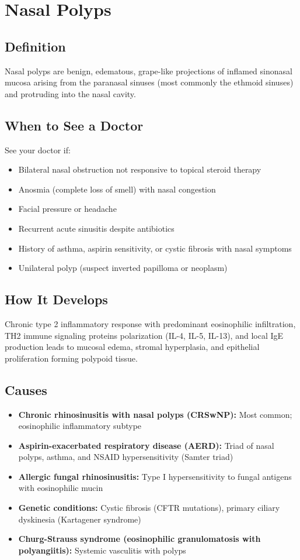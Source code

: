 \chapter{Nasal Polyps}

\section*{Definition}
Nasal polyps are benign, edematous, grape-like projections of inflamed sinonasal mucosa arising from the paranasal sinuses (most commonly the ethmoid sinuses) and protruding into the nasal cavity.

\section*{When to See a Doctor}
See your doctor if:
\begin{itemize}
  \item Bilateral nasal obstruction not responsive to topical steroid therapy
  \item Anosmia (complete loss of smell) with nasal congestion
  \item Facial pressure or headache
  \item Recurrent acute sinusitis despite antibiotics
  \item History of asthma, aspirin sensitivity, or cystic fibrosis with nasal symptoms
  \item Unilateral polyp (suspect inverted papilloma or neoplasm)
\end{itemize}

\section*{How It Develops}
Chronic type 2 inflammatory response with predominant eosinophilic infiltration, TH2 immune signaling proteins polarization (IL-4, IL-5, IL-13), and local IgE production leads to mucosal edema, stromal hyperplasia, and epithelial proliferation forming polypoid tissue.

\section*{Causes}
\begin{itemize}
  \item \textbf{Chronic rhinosinusitis with nasal polyps (CRSwNP):} Most common; eosinophilic inflammatory subtype
  \item \textbf{Aspirin-exacerbated respiratory disease (AERD):} Triad of nasal polyps, asthma, and NSAID hypersensitivity (Samter triad)
  \item \textbf{Allergic fungal rhinosinusitis:} Type I hypersensitivity to fungal antigens with eosinophilic mucin
  \item \textbf{Genetic conditions:} Cystic fibrosis (CFTR mutations), primary ciliary dyskinesia (Kartagener syndrome)
  \item \textbf{Churg-Strauss syndrome (eosinophilic granulomatosis with polyangiitis):} Systemic vasculitis with polyps
\end{itemize}

